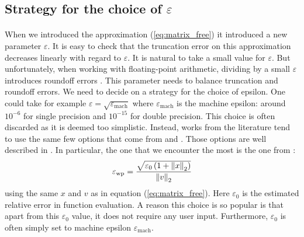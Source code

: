     \subsection{Strategy for the choice of \texorpdfstring{$\varepsilon$}{epsilon}}

      \paragraph{}
      When we introduced the approximation (\ref{eq:matrix_free}) it introduced a new parameter $\varepsilon$.
      It is easy to check that the truncation error on this approximation decreases linearly with regard to $\varepsilon$.
      It is natural to take a small value for $\varepsilon$.
      But unfortunately, when working with floating-point arithmetic, dividing by a small $\varepsilon$ introduces roundoff errors \cite{Martel2006}.
      This parameter needs to balance truncation and roundoff errors.
      We need to decide on a strategy for the choice of epsilon.
      One could take for example $\varepsilon = \sqrt{\varepsilon_\textrm{mach}}$ where $\varepsilon_\textrm{mach}$ is the machine epsilon: around $10^{-6}$ for single precision and $10^{-15}$ for double precision.
      This choice is often discarded as it is deemed too simplistic.
      Instead, works from the literature tend to use the same few options \cite{ParkNourgalievMartineauEtAl2009, LiuZhangZhongEtAl2015, AbhyankarBrownConstantinescuEtAl2018} that come from \cite{PerniceWalker1998} and \cite{DennisSchnabel1996}.
      Those options are well described in \cite{KnollKeyes2004}.
      In particular, the one that we encounter the most is the one from \cite{PerniceWalker1998}:
      \begin{equation}\label{eq:epsilon_wp}
        \varepsilon_\textrm{wp} = \frac{\sqrt{\varepsilon_0 \left(1 + \norm[2]{x}\right) }}{\norm[2]{v}}
      \end{equation}
      using the same $x$ and $v$ as in equation (\ref{eq:matrix_free}).
      Here $\varepsilon_0$ is the estimated relative error in function evaluation.
      A reason this choice is so popular is that apart from this $\varepsilon_0$ value, it does not require any user input.
      Furthermore, $\varepsilon_0$ is often simply set to machine epsilon $\varepsilon_\textrm{mach}$.

